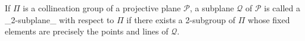 If $\Pi$ is a collineation group of a projective plane $\mathcal{P}$, a subplane $\mathcal{Q}$ of $\mathcal{P}$ is called a _2-subplane_ with respect to $\Pi$ if there exists a 2-subgroup of $\Pi$ whose fixed elements are precisely the points and lines of $\mathcal{Q}$.
